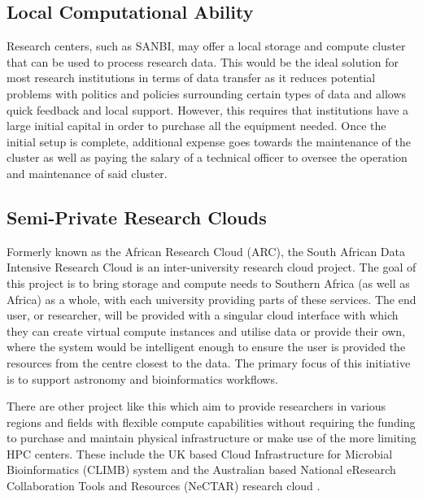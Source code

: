 \subsection{Local Computational Ability}

Research centers, such as SANBI, may offer a local storage and compute cluster that can be used to process research data. This would be the ideal solution for most research institutions in terms of data transfer as it reduces potential problems with politics and policies surrounding certain types of data and allows quick feedback and local support. However, this requires that institutions have a large initial capital in order to purchase all the equipment needed. Once the initial setup is complete, additional expense goes towards the maintenance of the cluster as well as paying the salary of a technical officer to oversee the operation and maintenance of said cluster.


\subsection{Semi-Private Research Clouds}

Formerly known as the African Research Cloud (ARC), the South African Data Intensive Research Cloud is an inter-university research cloud project. The goal of this project is to bring storage and compute needs to Southern Africa (as well as Africa) as a whole, with each university providing parts of these services. The end user, or researcher, will be provided with a singular cloud interface with which they can create virtual compute instances and utilise data or provide their own, where the system would be intelligent enough to ensure the user is provided the resources from the centre closest to the data. The primary focus of this initiative is to support astronomy and bioinformatics workflows.

There are other project like this which aim to provide researchers in various regions and fields with flexible compute capabilities without requiring the funding to purchase and maintain physical infrastructure or make use of the more limiting HPC centers. These include the UK based Cloud Infrastructure for Microbial Bioinformatics (CLIMB) system \parencite{connor2016climb} and the Australian based National eResearch Collaboration Tools and Resources (NeCTAR) research cloud \parencite{nectar_cloud}.


